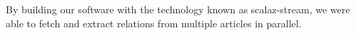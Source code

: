 By building our software with the technology known as scalaz-stream, we were able to fetch and extract relations
from multiple articles in parallel.
